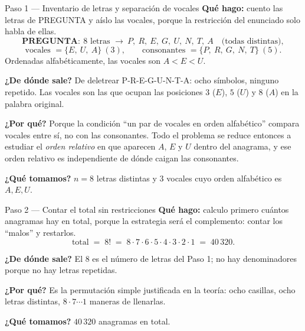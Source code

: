 \documentclass[11pt]{article}
\begin{document}
\begin{paso}{Paso 1 --- Inventario de letras y separación de vocales}
\textbf{Qué hago:} cuento las letras de PREGUNTA y aíslo las vocales, porque la restricción del enunciado
solo habla de ellas.
\[
\textbf{PREGUNTA}:\ 8 \text{ letras } \to\ P,\ R,\ E,\ G,\ U,\ N,\ T,\ A \quad\text{(todas distintas)},
\]
\[
\text{vocales } = \{E,\ U,\ A\}\ (3),\qquad \text{consonantes } = \{P,\ R,\ G,\ N,\ T\}\ (5).
\]
Ordenadas alfabéticamente, las vocales son $A < E < U$.

\textbf{¿De dónde sale?} De deletrear P-R-E-G-U-N-T-A: ocho símbolos, ninguno repetido. Las vocales son las
que ocupan las posiciones $3$ ($E$), $5$ ($U$) y $8$ ($A$) en la palabra original.

\textbf{¿Por qué?} Porque la condición ``un par de vocales en orden alfabético'' compara vocales entre sí, no
con las consonantes. Todo el problema se reduce entonces a estudiar el \emph{orden relativo} en que aparecen
$A$, $E$ y $U$ dentro del anagrama, y ese orden relativo es independiente de dónde caigan las consonantes.

\textbf{¿Qué tomamos?} $n=8$ letras distintas y $3$ vocales cuyo orden alfabético es $A,E,U$.
\end{paso}

\begin{paso}{Paso 2 --- Contar el total sin restricciones}
\textbf{Qué hago:} calculo primero cuántos anagramas hay en total, porque la estrategia será el
complemento: contar los ``malos'' y restarlos.
\[
\text{total} \;=\; 8! \;=\; 8\cdot7\cdot6\cdot5\cdot4\cdot3\cdot2\cdot1 \;=\; 40\,320.
\]

\textbf{¿De dónde sale?} El $8$ es el número de letras del Paso 1; no hay denominadores porque no hay
letras repetidas.

\textbf{¿Por qué?} Es la permutación simple justificada en la teoría: ocho casillas, ocho letras distintas,
$8\cdot7\cdots 1$ maneras de llenarlas.

\textbf{¿Qué tomamos?} $40\,320$ anagramas en total.
\end{paso}
\end{document}
